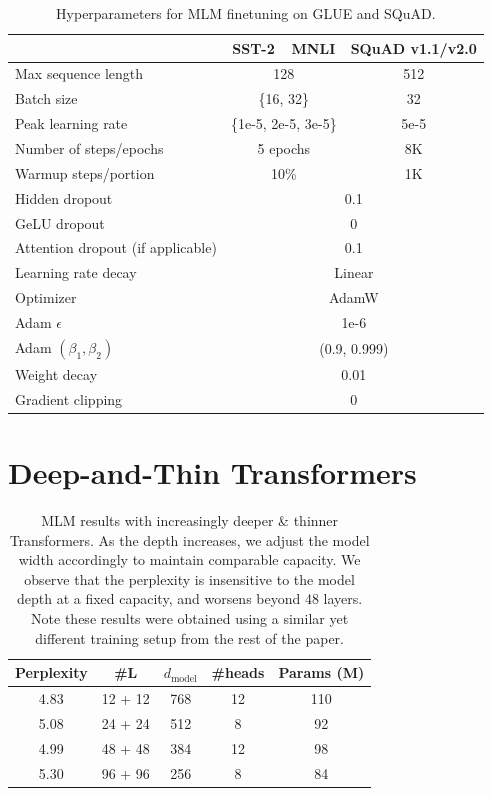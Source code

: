 \documentclass{article}
\begin{document}
\begin{table}[t]
\centering
\begin{tabular}{@{}l|cc|c@{}}
\toprule
 & SST-2 & MNLI & SQuAD v1.1/v2.0 \\ \midrule
Max sequence length & \multicolumn{2}{c|}{128} & 512 \\
Batch size & \multicolumn{2}{c|}{\{16, 32\}} & 32 \\
Peak learning rate & \multicolumn{2}{c|}{\{1e-5, 2e-5, 3e-5\}} & 5e-5 \\
Number of steps/epochs & \multicolumn{2}{c|}{5 epochs} & 8K \\
Warmup steps/portion & \multicolumn{2}{c|}{10\%} & 1K \\
\midrule
Hidden dropout & \multicolumn{3}{c}{0.1} \\
GeLU dropout & \multicolumn{3}{c}{0} \\
Attention dropout (if applicable) & \multicolumn{3}{c}{0.1} \\
Learning rate decay & \multicolumn{3}{c}{Linear} \\
Optimizer & \multicolumn{3}{c}{AdamW} \\
Adam $\epsilon$ & \multicolumn{3}{c}{1e-6} \\
Adam $(\beta_1, \beta_2)$ & \multicolumn{3}{c}{(0.9, 0.999)} \\
Weight decay & \multicolumn{3}{c}{0.01} \\
Gradient clipping & \multicolumn{3}{c}{0} \\
\bottomrule
\end{tabular}
\caption{Hyperparameters for MLM finetuning on GLUE and SQuAD.}
\end{table}


\FloatBarrier
\section{Deep-and-Thin Transformers}
\label{sec:deeper-thinner-tfm}
\begin{table}[h]
\centering
\begin{tabular}{@{}ccccc@{}}
\toprule
Perplexity & \#L & $d_\mathrm{model}$ & \#heads & Params (M) \\ \midrule
4.83 & 12 + 12 & 768 & 12 & 110 \\
5.08 & 24 + 24 & 512 & 8 & 92 \\
4.99 & 48 + 48 & 384 & 12 & 98 \\
5.30 & 96 + 96 & 256 & 8 & 84 \\ \bottomrule
\end{tabular}
\caption{MLM results with increasingly deeper \& thinner Transformers. As the depth increases,
we adjust the model width accordingly to maintain comparable capacity. We observe that the perplexity is insensitive to the model depth at a fixed capacity, and worsens beyond 48 layers. Note these results were obtained using a similar yet different training setup from the rest of the paper.}
\end{table}
\end{document}
